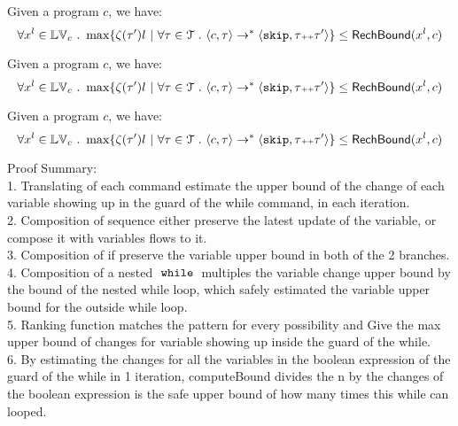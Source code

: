 \begin{lem}
  \label{lem:reachability_soundness}
Given a program ${c}$, we have:
%
\[
\forall x^l \in \lvar_c \st 
\max \left\{ \vcounter(\vtrace') l ~ \middle\vert~
\forall \vtrace \in \mathcal{T} \st \config{{c}, \trace} \to^{*} \config{\eskip, \trace\tracecat\vtrace'} \right\} 
\leq 
\rb(x^l, c)
\]
\end{lem}

\begin{lem}
  \label{lem:reachability_soundness}
Given a program ${c}$, we have:
%
\[
\forall x^l \in \lvar_c \st 
\max \left\{ \vcounter(\vtrace') l ~ \middle\vert~
\forall \vtrace \in \mathcal{T} \st \config{{c}, \trace} \to^{*} \config{\eskip, \trace\tracecat\vtrace'} \right\} 
\leq 
\rb(x^l, c)
\]
\end{lem}

  {
  \begin{lem}
    \label{lem:reachability_soundness}
  Given a program ${c}$, we have:
  \[
  \forall x^l \in \lvar_c \st 
  \max \left\{ \vcounter(\vtrace') l ~ \middle\vert~
  \forall \vtrace \in \mathcal{T} \st \config{{c}, \trace} \to^{*} \config{\eskip, \trace\tracecat\vtrace'} \right\} 
  \leq 
  \rb(x^l, c)
  \]
  \end{lem}
}
Proof Summary:
\\
1. Translating of each command estimate the upper bound of the change of each variable showing up in the guard of the while command, in each iteration.
\\
2. Composition of sequence either preserve the latest update of the variable, or compose it with variables flows to it.
\\
3. Composition of if preserve the variable upper bound in both of the 2 branches.
\\
4. Composition of a nested $\;\mathtt{while}\;$ multiples the variable change upper bound by the bound of the nested while loop, which safely estimated the variable upper bound for the outside while loop.
\\
5. Ranking function matches the pattern for every possibility and Give the max upper bound of changes for variable showing up inside the guard of the while.
\\
6. By estimating the changes for all the variables in the boolean expression of the guard of the while in 1 iteration, computeBound divides the n by the changes of the boolean expression is the safe upper bound of how many times this while can looped. 
